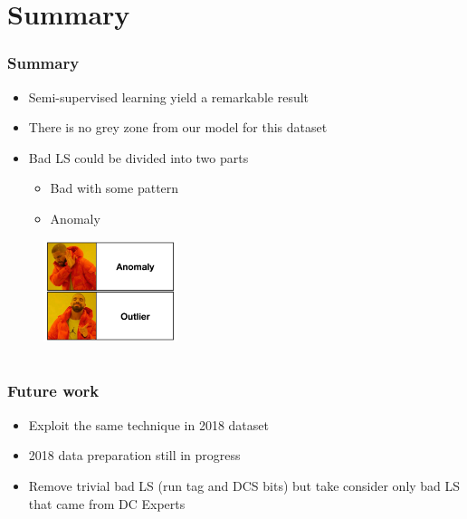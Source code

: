 \documentclass{beamer}
\begin{document}
\section{Summary} %
\begin{frame}
\frametitle{Summary}
\begin{itemize}
    \item Semi-supervised learning yield a remarkable result
    \item There is no grey zone from our model for this dataset
    \item Bad LS could be divided into two parts
    \begin{itemize}
        \item Bad with some pattern
        \item Anomaly
    \end{itemize}
\end{itemize}
\begin{figure}
    \includegraphics[height=0.4\textheight, width=0.35\textwidth]{images/meme_outlier}
\end{figure}
\end{frame}
\section{}

\begin{frame}
\frametitle{Future work}
\begin{itemize}
    \item Exploit the same technique in 2018 dataset
    \item 2018 data preparation still in progress
    \item Remove trivial bad LS (run tag and DCS bits) but take consider only bad LS that came from DC Experts
\end{itemize}
\end{frame}
\end{document}

